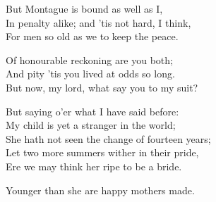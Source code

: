  
\begin{speech}
But Montague is bound as well as I, \\
In penalty alike; and 'tis not hard, I think, \\
For men so old as we to keep the peace. \\
\end{speech}
\begin{speech}
Of honourable reckoning are you both; \\
And pity 'tis you lived at odds so long. \\
But now, my lord, what say you to my suit? \\
\end{speech}
\begin{speech}
But saying o'er what I have said before: \\
My child is yet a stranger in the world; \\
She hath not seen the change of fourteen years; \\
Let two more summers wither in their pride, \\
Ere we may think her ripe to be a bride. \\
\end{speech}
\begin{speech}
Younger than she are happy mothers made. \\
\end{speech}
